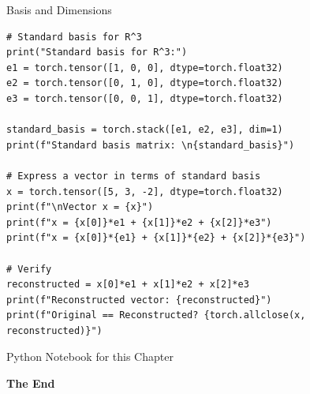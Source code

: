 \documentclass[aspectratio=169,xcolor=dvipsnames,svgnames,x11names,fleqn]{beamer}
\begin{document}
\begin{frame}[containsverbatim]{Basis and Dimensions}
\begin{verbatim}
# Standard basis for R^3
print("Standard basis for R^3:")
e1 = torch.tensor([1, 0, 0], dtype=torch.float32)
e2 = torch.tensor([0, 1, 0], dtype=torch.float32)
e3 = torch.tensor([0, 0, 1], dtype=torch.float32)

standard_basis = torch.stack([e1, e2, e3], dim=1)
print(f"Standard basis matrix: \n{standard_basis}")

# Express a vector in terms of standard basis
x = torch.tensor([5, 3, -2], dtype=torch.float32)
print(f"\nVector x = {x}")
print(f"x = {x[0]}*e1 + {x[1]}*e2 + {x[2]}*e3")
print(f"x = {x[0]}*{e1} + {x[1]}*{e2} + {x[2]}*{e3}")

# Verify
reconstructed = x[0]*e1 + x[1]*e2 + x[2]*e3
print(f"Reconstructed vector: {reconstructed}")
print(f"Original == Reconstructed? {torch.allclose(x, reconstructed)}")

\end{verbatim}
\end{frame}

    \begin{frame}[containsverbatim]{Python Notebook for this Chapter}
    \begin{center}
    \small
    { }
    
    \end{center}
    \end{frame}
    

\begin{frame}
    \Huge{\centerline{\color{bubblegumPink}\textbf{The End}}}
\end{frame}
\end{document}
